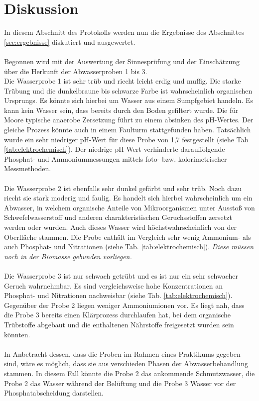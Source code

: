 \chapter{Diskussion}
\label{sec:diskussion}
In diesem Abschnitt des Protokolls werden nun die Ergebnisse des Abschnittes \ref{sec:ergebnisse} diskutiert und ausgewertet.\\\\
Begonnen wird mit der Auswertung der Sinnesprüfung und der Einschätzung über die Herkunft der Abwasserproben 1 bis 3.\\ 
Die Wasserprobe 1 ist sehr trüb und riecht leicht erdig und muffig. Die starke Trübung und die dunkelbraune bis schwarze Farbe ist wahrscheinlich organischen Ursprungs. Es könnte sich hierbei um Wasser aus einem Sumpfgebiet handeln. Es kann kein Wasser sein, dass bereits durch den Boden gefiltert wurde.
Die für Moore typische anaerobe Zersetzung führt zu einem absinken des pH-Wertes. Der gleiche Prozess könnte auch in einem Faulturm stattgefunden haben. Tatsächlich wurde ein sehr niedriger pH-Wert für diese Probe von 1,7 festgestellt (siehe Tab \ref{tab:elektrochemisch}). Der niedrige pH-Wert verhinderte darauffolgende Phosphat- und Ammoniummessungen mittels foto- bzw. kolorimetrischer Messmethoden.\\ \\
Die Wasserprobe 2 ist ebenfalls sehr dunkel gefärbt und sehr trüb. Noch dazu riecht sie stark moderig und faulig. Es handelt sich hierbei wahrscheinlich um ein Abwasser, in welchem organische Anteile von Mikroorganismen unter Ausstoß von Schwefelwasserstoff und anderen charakteristischen Geruchsstoffen zersetzt werden oder wurden. Auch dieses Wasser wird höchstwahrscheinlich von der Oberfläche stammen. Die Probe enthält im Vergleich sehr wenig Ammonium- als auch Phosphat- und Nitrationen (siehe Tab. \ref{tab:elektrochemisch}). \textit{Diese müssen noch in der Biomasse gebunden vorliegen.}\\ \\
Die Wasserprobe 3 ist nur schwach getrübt und es ist nur ein sehr schwacher Geruch wahrnehmbar. Es sind vergleichsweise hohe Konzentrationen an Phosphat- und Nitrationen nachweisbar (siehe Tab. \ref{tab:elektrochemisch}). Gegenüber der Probe 2 liegen weniger Ammoniumionen vor. Es liegt nah, dass die Probe 3 bereits einen Klärprozess durchlaufen hat, bei dem organische Trübstoffe abgebaut und die enthaltenen Nährstoffe freigesetzt wurden sein könnten.\\ \\
In Anbetracht dessen, dass die Proben im Rahmen eines Praktikums gegeben sind, wäre es möglich, dass sie aus verschieden Phasen der Abwasserbehandlung stammen. In diesem Fall könnte die Probe 2 das ankommende Schmutzwasser, die Probe 2 das Wasser während der Belüftung und die Probe 3 Wasser vor der Phosphatabscheidung darstellen. \\
